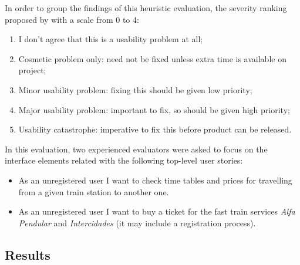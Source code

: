 \documentclass[a4paper]{article}
\begin{document}
In order to group the findings of this heuristic evaluation, the severity ranking proposed by \citet{nielsen1995rating} with a scale from 0 to 4:

\begin{enumerate}[start=0, label={\theenumi{} -}]
\item I don't agree that this is a usability problem at all;
\item Cosmetic problem only: need not be fixed unless extra time is available on project;
\item Minor usability problem: fixing this should be given low priority;
\item Major usability problem: important to fix, so should be given high priority;
\item Usability catastrophe: imperative to fix this before product can be released.
\end{enumerate}

In this evaluation, two experienced evaluators were asked to focus on the interface elements related with the following top-level user stories:
\begin{itemize}
  \item As an unregistered user I want to check time tables and prices for travelling from a given train station to another one.
  \item As an unregistered user I want to buy a ticket for the fast train services \textit{Alfa Pendular} and \textit{Intercidades} (it may include a registration process).
\end{itemize}

\subsection{Results}
\end{document}
